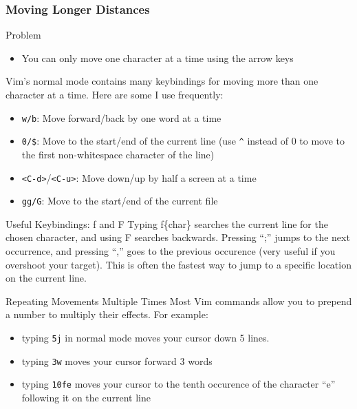 \documentclass{beamer}
\begin{document}
\begin{frame}[fragile]
    \frametitle{Moving Longer Distances}
    \small
    \begin{block}{Problem}
	\begin{itemize}
	    \item You can only move one character at a time using the arrow keys
	\end{itemize}
    \end{block}
    Vim's normal mode contains many keybindings for moving more than one character at a time. Here are some I use frequently:
    \begin{itemize}
	\item \verb+w/b+:  Move forward/back by one word at a time
	\item \verb+0/$+:  Move to the start/end of the current line (use \verb+^+ instead of 0 to move to the first non-whitespace character of the line)
	\item \verb+<C-d>+/\verb+<C-u>+:  Move down/up by half a screen at a time
	\item \verb+gg/G+:  Move to the start/end of the current file
    \end{itemize}
    \begin{block}{Useful Keybindings: f and F}
	Typing f\{char\} searches the current line for the chosen character, and using F searches backwards. Pressing \enquote{;} jumps to the next occurrence, and pressing \enquote{,} goes to the previous occurence (very useful if you overshoot your target). This is often the fastest way to jump to a specific location on the current line.
    \end{block}
\end{frame}

\begin{frame}[fragile]
    \begin{block}{Repeating Movements Multiple Times}
	Most Vim commands allow you to prepend a number to multiply their effects. For example:
	\begin{itemize}
	    \item typing \verb+5j+ in normal mode moves your cursor down 5 lines.
	    \item typing \verb+3w+ moves your cursor forward 3 words
	    \item typing \verb+10fe+ moves your cursor to the tenth occurence of the character \enquote{e} following it on the current line
	\end{itemize}
    \end{block}
\end{frame}
\end{document}
